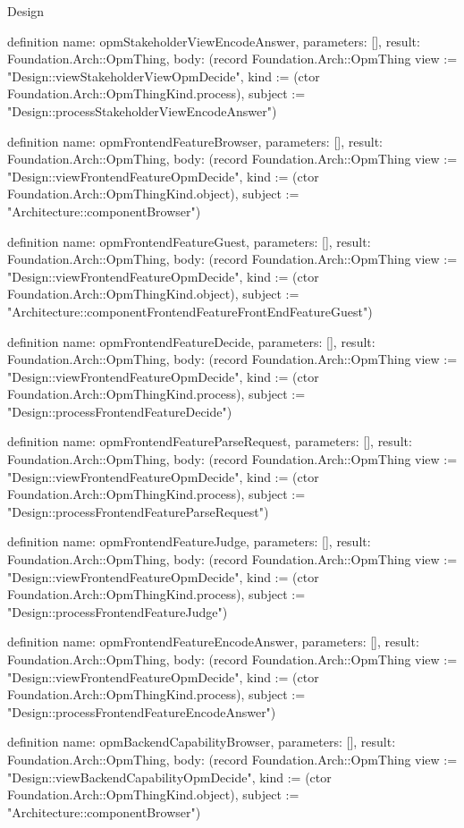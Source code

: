 \begin{lexlean}{Design}
\begin{semanticmodule}
definition{
  name: opmStakeholderViewEncodeAnswer,
  parameters: [],
  result: Foundation.Arch::OpmThing,
  body: (record Foundation.Arch::OpmThing {view := "Design::viewStakeholderViewOpmDecide", kind := (ctor Foundation.Arch::OpmThingKind.process), subject := "Design::processStakeholderViewEncodeAnswer"})
}

definition{
  name: opmFrontendFeatureBrowser,
  parameters: [],
  result: Foundation.Arch::OpmThing,
  body: (record Foundation.Arch::OpmThing {view := "Design::viewFrontendFeatureOpmDecide", kind := (ctor Foundation.Arch::OpmThingKind.object), subject := "Architecture::componentBrowser"})
}

definition{
  name: opmFrontendFeatureGuest,
  parameters: [],
  result: Foundation.Arch::OpmThing,
  body: (record Foundation.Arch::OpmThing {view := "Design::viewFrontendFeatureOpmDecide", kind := (ctor Foundation.Arch::OpmThingKind.object), subject := "Architecture::componentFrontendFeatureFrontEndFeatureGuest"})
}

definition{
  name: opmFrontendFeatureDecide,
  parameters: [],
  result: Foundation.Arch::OpmThing,
  body: (record Foundation.Arch::OpmThing {view := "Design::viewFrontendFeatureOpmDecide", kind := (ctor Foundation.Arch::OpmThingKind.process), subject := "Design::processFrontendFeatureDecide"})
}

definition{
  name: opmFrontendFeatureParseRequest,
  parameters: [],
  result: Foundation.Arch::OpmThing,
  body: (record Foundation.Arch::OpmThing {view := "Design::viewFrontendFeatureOpmDecide", kind := (ctor Foundation.Arch::OpmThingKind.process), subject := "Design::processFrontendFeatureParseRequest"})
}

definition{
  name: opmFrontendFeatureJudge,
  parameters: [],
  result: Foundation.Arch::OpmThing,
  body: (record Foundation.Arch::OpmThing {view := "Design::viewFrontendFeatureOpmDecide", kind := (ctor Foundation.Arch::OpmThingKind.process), subject := "Design::processFrontendFeatureJudge"})
}

definition{
  name: opmFrontendFeatureEncodeAnswer,
  parameters: [],
  result: Foundation.Arch::OpmThing,
  body: (record Foundation.Arch::OpmThing {view := "Design::viewFrontendFeatureOpmDecide", kind := (ctor Foundation.Arch::OpmThingKind.process), subject := "Design::processFrontendFeatureEncodeAnswer"})
}

definition{
  name: opmBackendCapabilityBrowser,
  parameters: [],
  result: Foundation.Arch::OpmThing,
  body: (record Foundation.Arch::OpmThing {view := "Design::viewBackendCapabilityOpmDecide", kind := (ctor Foundation.Arch::OpmThingKind.object), subject := "Architecture::componentBrowser"})
}


\end{semanticmodule}
\end{lexlean}
